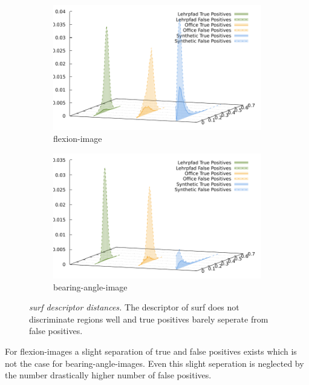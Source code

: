 \begin{figure}[H]
\begin{subfigure}[t]{0.45\linewidth}
    \includegraphics[width=\linewidth]{chapter06/results/SURF/flexion/descriptor_distances.pdf}%
    \caption{\gls{flexion-image}}
\end{subfigure}\quad
\begin{subfigure}[t]{0.45\linewidth}
    \includegraphics[width=\linewidth]{chapter06/results/SURF/bearing/descriptor_distances.pdf}%
    \caption{\gls{bearing-angle-image}}
\end{subfigure}
\caption[\acrshort{surf} descriptor distances]{\emph{\acrshort{surf} descriptor distances.} The descriptor of \acrshort{surf} does not discriminate regions well and true positives barely seperate from false positives.}\label{fig:surf_descriptor_distance}
\end{figure}
For \glspl{flexion-image} a slight separation of true and false positives exists which is not the case for \glspl{bearing-angle-image}.
Even this slight seperation is neglected by the number drastically higher number of false positives.
